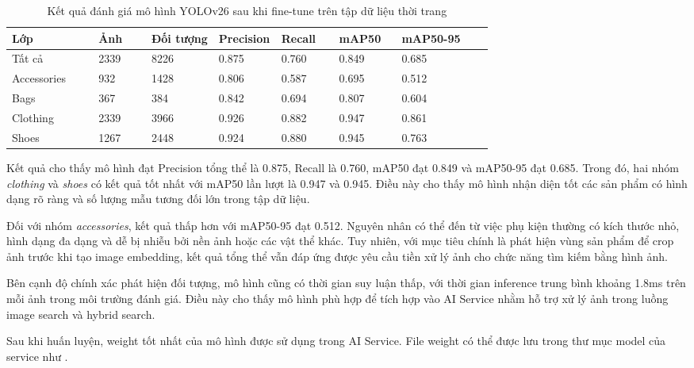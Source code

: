 \begin{table}[H]
\centering
\caption{Kết quả đánh giá mô hình YOLOv26 sau khi fine-tune trên tập dữ liệu thời trang}
\label{tab:yolov26-finetune-result}
\begin{tabularx}{\linewidth}{|p{0.18\linewidth}|p{0.11\linewidth}|p{0.14\linewidth}|p{0.13\linewidth}|p{0.12\linewidth}|p{0.13\linewidth}|X|}
\hline
\textbf{Lớp} & \textbf{Ảnh} & \textbf{Đối tượng} & \textbf{Precision} & \textbf{Recall} & \textbf{mAP50} & \textbf{mAP50-95} \\ \hline
Tất cả & 2339 & 8226 & 0.875 & 0.760 & 0.849 & 0.685 \\ \hline
Accessories & 932 & 1428 & 0.806 & 0.587 & 0.695 & 0.512 \\ \hline
Bags & 367 & 384 & 0.842 & 0.694 & 0.807 & 0.604 \\ \hline
Clothing & 2339 & 3966 & 0.926 & 0.882 & 0.947 & 0.861 \\ \hline
Shoes & 1267 & 2448 & 0.924 & 0.880 & 0.945 & 0.763 \\ \hline
\end{tabularx}
\end{table}

Kết quả cho thấy mô hình đạt Precision tổng thể là 0.875, Recall là 0.760, mAP50 đạt 0.849 và mAP50-95 đạt 0.685. Trong đó, hai nhóm \textit{clothing} và \textit{shoes} có kết quả tốt nhất với mAP50 lần lượt là 0.947 và 0.945. Điều này cho thấy mô hình nhận diện tốt các sản phẩm có hình dạng rõ ràng và số lượng mẫu tương đối lớn trong tập dữ liệu.

Đối với nhóm \textit{accessories}, kết quả thấp hơn với mAP50-95 đạt 0.512. Nguyên nhân có thể đến từ việc phụ kiện thường có kích thước nhỏ, hình dạng đa dạng và dễ bị nhiễu bởi nền ảnh hoặc các vật thể khác. Tuy nhiên, với mục tiêu chính là phát hiện vùng sản phẩm để crop ảnh trước khi tạo image embedding, kết quả tổng thể vẫn đáp ứng được yêu cầu tiền xử lý ảnh cho chức năng tìm kiếm bằng hình ảnh.

Bên cạnh độ chính xác phát hiện đối tượng, mô hình cũng có thời gian suy luận thấp, với thời gian inference trung bình khoảng 1.8ms trên mỗi ảnh trong môi trường đánh giá. Điều này cho thấy mô hình phù hợp để tích hợp vào AI Service nhằm hỗ trợ xử lý ảnh trong luồng image search và hybrid search.

Sau khi huấn luyện, weight tốt nhất của mô hình được sử dụng trong AI Service. File weight có thể được lưu trong thư mục model của service như .

